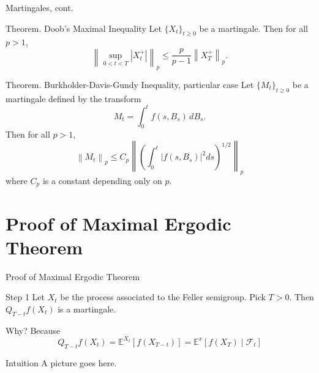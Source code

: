 \documentclass{if-beamer}
\begin{document}
\begin{frame}{Martingales, cont.}
    \begin{block}{Theorem. Doob's Maximal Inequality}
        Let $\{X_t\}_{t \geq 0}$ be a martingale. Then for all $p > 1$,
        \begin{equation*}
            \left\|\sup_{0 < t < T} |X_t^+|\right\|_p \leq \frac{p}{p-1} \left\|X_T^+\right\|_p
        .\end{equation*}
    \end{block}

    \begin{block}{Theorem. Burkholder-Davis-Gundy Inequality, particular case}
        Let $\{M_t\}_{t \geq 0}$ be a martingale defined by the transform
        \begin{equation*}
            M_t = \int_0^t f(s,B_s) \, dB_s
        .\end{equation*}
        Then for all $p > 1$,
        \begin{equation*}
            \left\|M_t\right\|_p \leq C_p \left\|\left(\int_0^t |f(s, B_s)|^2 ds \right)^{1/2}\right\|_p
        \end{equation*}
        where $C_p$ is a constant depending only on $p$.
    \end{block}

    
\end{frame}

\section{Proof of Maximal Ergodic Theorem}

\begin{frame}{Proof of Maximal Ergodic Theorem}

    \begin{block}{Step 1}
        Let $X_t$ be the process associated to the Feller semigroup. Pick $T > 0$. Then $Q_{T - t} f(X_t)$ is a martingale.
    \end{block}
    Why? Because
    \begin{equation*}
        Q_{T - t} f(X_t) = \mathbb{E}^{X_t}[f(X_{T - t})] = \mathbb{E}^x [f(X_T) \mid \mathcal{F}_t]
    \end{equation*}
    \begin{exampleblock}{Intuition}
        A picture goes here.
    \end{exampleblock}
    
    
\end{frame}
\end{document}
